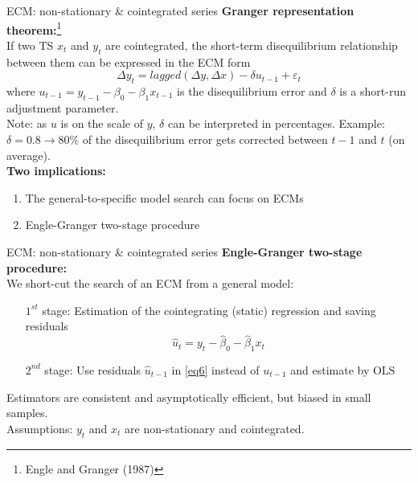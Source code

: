 \documentclass{beamer}
\begin{document}
\begin{frame}{ECM: non-stationary \& cointegrated series}
\textbf{Granger representation theorem:}\footnote{Engle and Granger (1987)}\\
If two TS $x_t$ and $y_t$ are cointegrated, the short-term disequilibrium relationship between them can be expressed in the ECM form
\vspace{-0.2cm}
\begin{equation} \label{eq6}
 \Delta y_t = lagged(\Delta y, \Delta x) - \delta u_{t-1} + \varepsilon_t 
\end{equation}
where $u_{t-1} = y_{t-1} - \beta_0 - \beta_1 x_{t-1}$ is the disequilibrium error and $\delta$ is a short-run adjustment parameter. \\
\footnotesize{Note: as $u$ is on the scale of $y$, $\delta$ can be interpreted in percentages. Example: $\delta = 0.8 \rightarrow 80 \%$ of the disequilibrium error gets corrected between $t-1$ and $t$ (on average).}\\
\medskip
\textbf{Two implications:}\\ \smallskip
\begin{enumerate}
\item The general-to-specific model search can focus on ECMs
\item Engle-Granger two-stage procedure
\end{enumerate}
\end{frame}
\begin{frame}{ECM: non-stationary \& cointegrated series}
\textbf{Engle-Granger two-stage procedure:}\\
\medskip
We short-cut the search of an ECM from a general model:\\ \medskip
\begin{itemize}
\item[ $1^{st}$ ]  stage: Estimation of the cointegrating (static) regression and saving residuals $$\hat{u}_t = y_t - \hat{\beta}_0 - \hat{\beta}_1 x_t$$

\item [$2^{nd}$]  stage: Use residuals $\hat{u}_{t-1}$ in \eqref{eq6} instead of $u_{t-1}$ and estimate by OLS
\end{itemize} \medskip
Estimators are consistent and asymptotically efficient, but biased in small samples.\\ 
\medskip
\small{Assumptions: $y_t$ and $x_t$ are non-stationary and cointegrated.}
\end{frame}
\end{document}
